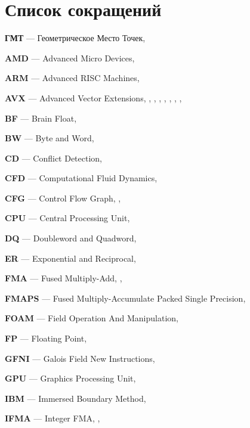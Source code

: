 \newpage

\section*{Список сокращений}

\textbf{ГМТ} --- Геометрическое Место Точек, \pageref{abbr:gmt}

\textbf{AMD} --- Advanced Micro Devices, \pageref{abbr:amd}

\textbf{ARM} --- Advanced RISC Machines, \pageref{abbr:arm}

\textbf{AVX} --- Advanced Vector Extensions, \pageref{abbr:avx}, \pageref{abbr:avx2}, \pageref{abbr:avx3}, \pageref{abbr:avx4}, \pageref{abbr:avx5}, \pageref{abbr:avx6}, \pageref{abbr:avx7}, \pageref{abbr:avx8}

\textbf{BF} --- Brain Float, \pageref{abbr:bf}

\textbf{BW} --- Byte and Word, \pageref{abbr:bw}

\textbf{CD} --- Conflict Detection, \pageref{abbr:cd}

\textbf{CFD} --- Computational Fluid Dynamics, \pageref{abbr:cfd}

\textbf{CFG} --- Control Flow Graph, \pageref{abbr:cfg}, \pageref{abbr:cfg2}

\textbf{CPU} --- Central Processing Unit, \pageref{abbr:cpu}

\textbf{DQ} --- Doubleword and Quadword, \pageref{abbr:dq}

\textbf{ER} --- Exponential and Reciprocal, \pageref{abbr:er}

\textbf{FMA} --- Fused Multiply-Add, \pageref{abbr:fma}, \pageref{abbr:fma2}

\textbf{FMAPS} --- Fused Multiply-Accumulate Packed Single Precision, \pageref{abbr:fmaps}
 
\textbf{FOAM} --- Field Operation And Manipulation, \pageref{abbr:foam} 
 
\textbf{FP} --- Floating Point, \pageref{abbr:fp}

\textbf{GFNI} --- Galois Field New Instructions, \pageref{abbr:gfni}

\textbf{GPU} --- Graphics Processing Unit, \pageref{abbr:gpu}

\textbf{IBM} --- Immersed Boundary Method, \pageref{abbr:ibm}

\textbf{IFMA} --- Integer FMA, \pageref{abbr:ifma}, \pageref{abbr:ifma2}

